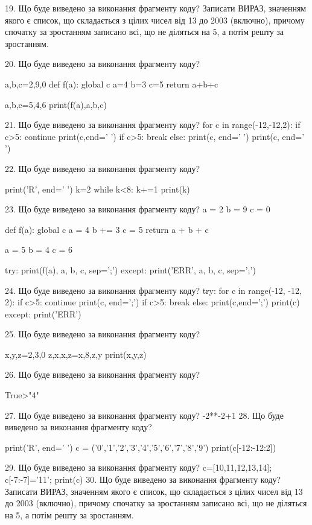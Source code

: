 \documentclass[11pt]{article}
\begin{document}
19. Що буде виведено за виконання фрагменту коду?
Записати ВИРАЗ, значенням якого є список, що складається з цілих чисел від 13 до 2003 (включно), причому спочатку за зростанням записано всі, що не діляться на 5, а потім решту за зростанням.

20. Що буде виведено за виконання фрагменту коду?

a,b,c=2,9,0
def f(a):
global c    a=4
    b=3
    c=5
    return a+b+c

a,b,c=5,4,6
print(f(a),a,b,c)

21. Що буде виведено за виконання фрагменту коду?
for c in range(-12,-12,2):
    if c>5:
        continue
        print(c,end=' ')
    if c>5:
        break
else:
    print(c, end=' ')
print(c, end=' ')

22. Що буде виведено за виконання фрагменту коду?

print('R', end=' ')
k=2
while k<8:
    k+=1
print(k)


23. Що буде виведено за виконання фрагменту коду?
a = 2
b = 9
c = 0

def f(a):
global c    a = 4
    b += 3
    c = 5
    return a + b + c

a = 5
b = 4
c = 6

try:
    print(f(a), a, b, c, sep=';')
except:
    print('ERR', a, b, c, sep=';')

24. Що буде виведено за виконання фрагменту коду?
try:
    for c in range(-12, -12, 2):
        if c>5:
            continue
        print(c, end=';')
        if c>5:
            break
    else:
        print(c,end=';')
    print(c)
except:
    print('ERR')

25. Що буде виведено за виконання фрагменту коду?

x,y,z=2,3,0
z,x,x,z=x,8,z,y
print(x,y,z)

26. Що буде виведено за виконання фрагменту коду?

True>"4"

27. Що буде виведено за виконання фрагменту коду?
-2**-2+1
28. Що буде виведено за виконання фрагменту коду?

print('R', end=' ')
c = ('0','1','2','3','4','5','6','7','8','9')
print(c[-12:-12:2])


29. Що буде виведено за виконання фрагменту коду?
c=[10,11,12,13,14]; c[-7:-7]='11'; print(c)
30. Що буде виведено за виконання фрагменту коду?
Записати ВИРАЗ, значенням якого є список, що складається з цілих чисел від 13 до 2003 (включно), причому спочатку за зростанням записано всі, що не діляться на 5, а потім решту за зростанням.
\end{document}
